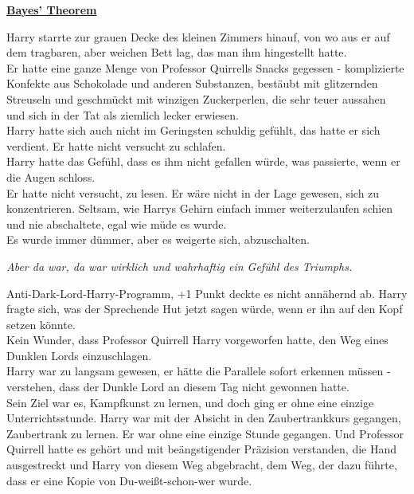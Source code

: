 

\hypertarget{bayes-theorem}{%

\textbf{\uline{Bayes' Theorem}}

Harry starrte zur grauen Decke des kleinen Zimmers hinauf, von wo aus er auf dem tragbaren, aber weichen Bett lag, das man ihm hingestellt hatte.\\ Er hatte eine ganze Menge von Professor Quirrells Snacks gegessen - komplizierte Konfekte aus Schokolade und anderen Substanzen, bestäubt mit glitzernden Streuseln und geschmückt mit winzigen Zuckerperlen, die sehr teuer aussahen und sich in der Tat als ziemlich lecker erwiesen.\\ Harry hatte sich auch nicht im Geringsten schuldig gefühlt, das hatte er sich verdient. Er hatte nicht versucht zu schlafen.\\ Harry hatte das Gefühl, dass es ihm nicht gefallen würde, was passierte, wenn er die Augen schloss.\\ Er hatte nicht versucht, zu lesen. Er wäre nicht in der Lage gewesen, sich zu konzentrieren. Seltsam, wie Harrys Gehirn einfach immer weiterzulaufen schien und nie abschaltete, egal wie müde es wurde.\\ Es wurde immer dümmer, aber es weigerte sich, abzuschalten.

\emph{Aber da war, da war wirklich und wahrhaftig ein Gefühl des Triumphs.}

Anti-Dark-Lord-Harry-Programm, +1 Punkt deckte es nicht annähernd ab. Harry fragte sich, was der Sprechende Hut jetzt sagen würde, wenn er ihn auf den Kopf setzen könnte.\\ Kein Wunder, dass Professor Quirrell Harry vorgeworfen hatte, den Weg eines Dunklen Lords einzuschlagen.\\ Harry war zu langsam gewesen, er hätte die Parallele sofort erkennen müssen - verstehen, dass der Dunkle Lord an diesem Tag nicht gewonnen hatte.\\ Sein Ziel war es, Kampfkunst zu lernen, und doch ging er ohne eine einzige Unterrichtsstunde. Harry war mit der Absicht in den Zaubertrankkurs gegangen, Zaubertrank zu lernen. Er war ohne eine einzige Stunde gegangen. Und Professor Quirrell hatte es gehört und mit beängstigender Präzision verstanden, die Hand ausgestreckt und Harry von diesem Weg abgebracht, dem Weg, der dazu führte, dass er eine Kopie von Du-weißt-schon-wer wurde.

}
